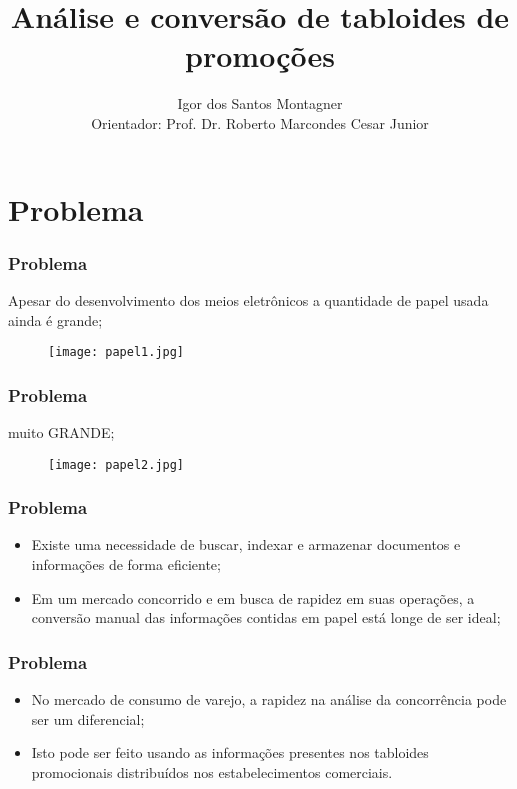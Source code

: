\documentclass{beamer}
\title{Análise e conversão de tabloides de promoções}
\author{Igor dos Santos Montagner \\ Orientador: Prof. Dr. Roberto Marcondes Cesar Junior }
\begin{document}
\begin{frame}
\titlepage
\end{frame}

\section{Problema}

\begin{frame}
\frametitle{Problema}
Apesar do desenvolvimento dos meios eletrônicos a quantidade de papel usada ainda é grande; \pause
\begin{figure}[!ht]
    \texttt{[image: papel1.jpg]}
\end{figure}   
\end{frame}

\begin{frame}
\frametitle{Problema}
\begin{center}muito GRANDE; \end{center}
\begin{figure}[!ht]
    \texttt{[image: papel2.jpg]}
\end{figure}   
\end{frame}

\begin{frame}
\frametitle{Problema}

\begin{itemize}

\item Existe uma necessidade de buscar, indexar e armazenar documentos e informações de forma eficiente; \pause

\item Em um mercado concorrido e em busca de rapidez em suas operações, a conversão manual das informações contidas em papel está longe de ser ideal;

\end{itemize}

\end{frame}

\begin{frame}
\frametitle{Problema}

\begin{itemize}

\item No mercado de consumo de varejo, a rapidez na análise da concorrência pode ser um diferencial; \pause

\item Isto pode ser feito usando as informações presentes nos tabloides promocionais distribuídos nos estabelecimentos comerciais.

\end{itemize}

\end{frame}
\end{document}
